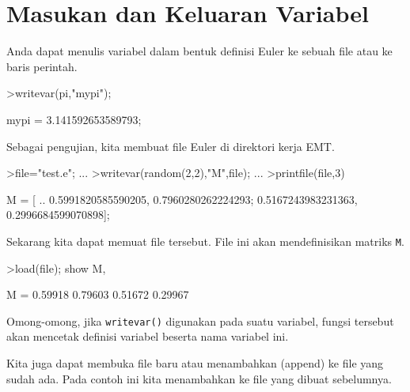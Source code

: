 \documentclass[a4paper,11pt,oneside,enabledeprecatedfontcommands]{scrbook}
\newenvironment{eulernotebook}{}{}
\newcommand{\eulerheading}[1]{\chapter{#1}}
\newenvironment{eulercomment}{\par\medskip\noindent}{\par\medskip}
\begin{document}
\begin{eulernotebook}
		\eulerheading{Masukan dan Keluaran Variabel}
		\begin{eulercomment}
			Anda dapat menulis variabel dalam bentuk definisi Euler ke sebuah file atau ke baris perintah.
		\end{eulercomment}
		\begin{eulerprompt}
			>writevar(pi,"mypi");
		\end{eulerprompt}
		\begin{euleroutput}
			mypi = 3.141592653589793;
		\end{euleroutput}
		\begin{eulercomment}
			Sebagai pengujian, kita membuat file Euler di direktori kerja EMT.
		\end{eulercomment}
		\begin{eulerprompt}
			>file="test.e"; ...
			>writevar(random(2,2),"M",file); ...
			>printfile(file,3)
		\end{eulerprompt}
		\begin{euleroutput}
			M = [ ..
			0.5991820585590205, 0.7960280262224293;
			0.5167243983231363, 0.2996684599070898];
		\end{euleroutput}
		\begin{eulercomment}
			Sekarang kita dapat memuat file tersebut. File ini akan mendefinisikan matriks \texttt{M}.
		\end{eulercomment}
		\begin{eulerprompt}
			>load(file); show M,
		\end{eulerprompt}
		\begin{euleroutput}
			M = 
			  0.59918   0.79603 
			  0.51672   0.29967 
		\end{euleroutput}
		\begin{eulercomment}
			Omong-omong, jika \texttt{writevar()} digunakan pada suatu variabel, fungsi tersebut akan mencetak definisi
			variabel beserta nama variabel ini.
		\end{eulercomment}
		\begin{eulercomment}
			Kita juga dapat membuka file baru atau menambahkan (append) ke file yang sudah ada. Pada contoh ini
			kita menambahkan ke file yang dibuat sebelumnya.

\end{eulercomment}
\end{eulernotebook}
\end{document}
